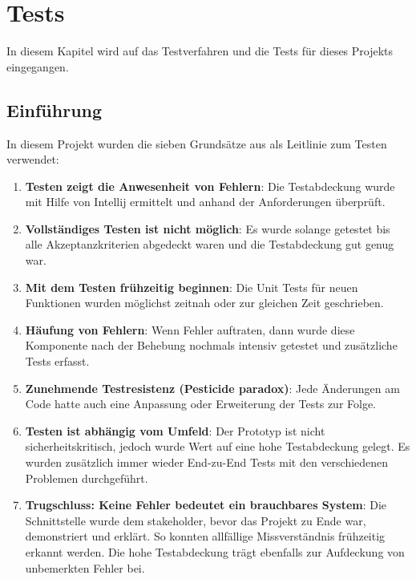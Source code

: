 %
%

\chapter{Tests \resultAssignment{[R6]}}\label{chap.tests} 
In diesem Kapitel wird auf das Testverfahren und die Tests für dieses Projekts eingegangen.

\section{Einführung}
In diesem Projekt wurden die sieben Grundsätze aus \cite{test_soft_book} als Leitlinie zum Testen verwendet:
\begin{enumerate}
\item \textbf{Testen zeigt die Anwesenheit von Fehlern}: Die Testabdeckung wurde mit Hilfe von Intellij ermittelt und anhand der Anforderungen überprüft.
\item \textbf{Vollständiges Testen ist nicht möglich}: Es wurde solange getestet bis alle Akzeptanzkriterien abgedeckt waren und die Testabdeckung gut genug war.
\item \textbf{Mit dem Testen frühzeitig beginnen}: Die Unit Tests für neuen Funktionen wurden möglichst zeitnah oder zur gleichen Zeit geschrieben.
\item \textbf{Häufung von Fehlern}: Wenn Fehler auftraten, dann wurde diese Komponente nach der Behebung nochmals intensiv getestet und zusätzliche Tests erfasst.
\item \textbf{Zunehmende Testresistenz (Pesticide paradox)}: Jede Änderungen am Code hatte auch eine Anpassung oder Erweiterung der Tests zur Folge.
\item \textbf{Testen ist abhängig vom Umfeld}: Der Prototyp ist nicht sicherheitskritisch, jedoch wurde Wert auf eine hohe Testabdeckung gelegt. Es wurden zusätzlich immer wieder 
	End-zu-End Tests mit den verschiedenen Problemen durchgeführt.
\item \textbf{Trugschluss: Keine Fehler bedeutet ein brauchbares System}: Die Schnittstelle wurde dem \gls{stakeholder}, bevor das Projekt zu Ende war, demonstriert und erklärt. So 
	konnten allfällige Missverständnis frühzeitig erkannt werden. Die hohe Testabdeckung trägt ebenfalls zur Aufdeckung von unbemerkten Fehler bei.
\end{enumerate}

